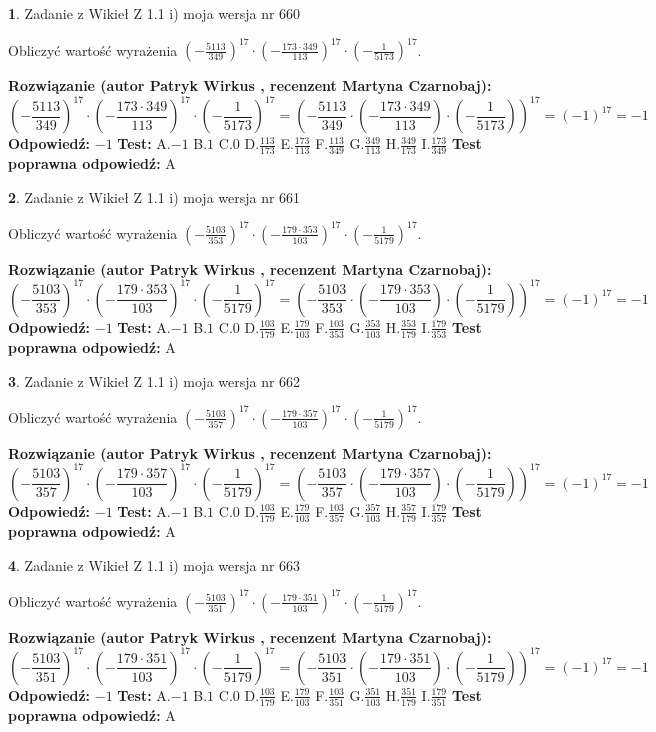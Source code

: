 \documentclass[12pt, a4paper]{article}
\theoremstyle{definition} %
\newtheorem{zad}{}
\newcommand{\zadStart}[1]{\begin{zad}#1\newline}
\newcommand{\zadStop}{\end{zad}}
\newcommand{\rozwStart}[2]{\noindent \textbf{Rozwiązanie (autor #1 , recenzent #2): }\newline}
\newcommand{\rozwStop}{\newline}
\newcommand{\odpStart}{\noindent \textbf{Odpowiedź:}\newline}
\newcommand{\odpStop}{\newline}
\newcommand{\testStart}{\noindent \textbf{Test:}\newline}
\newcommand{\testStop}{\newline}
\newcommand{\kluczStart}{\noindent \textbf{Test poprawna odpowiedź:}\newline}
\newcommand{\kluczStop}{\newline}
\begin{document}
\zadStart{Zadanie z Wikieł Z 1.1 i) moja wersja nr 660}

Obliczyć wartość wyrażenia $(-\frac{5113}{349})^{17} \cdot (-\frac{173 \cdot 349}{113})^{17} \cdot (-\frac{1}{5173})^{17}$.
\zadStop
\rozwStart{Patryk Wirkus}{Martyna Czarnobaj}
$$(-\frac{5113}{349})^{17} \cdot (-\frac{173 \cdot 349}{113})^{17} \cdot (-\frac{1}{5173})^{17} = (-\frac{5113}{349} \cdot (-\frac{173 \cdot 349}{113}) \cdot (-\frac{1}{5173}))^{17} = (-1)^{17} = -1$$
\rozwStop
\odpStart
$-1$
\odpStop
\testStart
A.$-1$ B.$1$ C.$0$ D.$\frac{113}{173}$ E.$\frac{173}{113}$
F.$\frac{113}{349}$ G.$\frac{349}{113}$
H.$\frac{349}{173}$
I.$\frac{173}{349}$
\testStop
\kluczStart
A
\kluczStop



\zadStart{Zadanie z Wikieł Z 1.1 i) moja wersja nr 661}

Obliczyć wartość wyrażenia $(-\frac{5103}{353})^{17} \cdot (-\frac{179 \cdot 353}{103})^{17} \cdot (-\frac{1}{5179})^{17}$.
\zadStop
\rozwStart{Patryk Wirkus}{Martyna Czarnobaj}
$$(-\frac{5103}{353})^{17} \cdot (-\frac{179 \cdot 353}{103})^{17} \cdot (-\frac{1}{5179})^{17} = (-\frac{5103}{353} \cdot (-\frac{179 \cdot 353}{103}) \cdot (-\frac{1}{5179}))^{17} = (-1)^{17} = -1$$
\rozwStop
\odpStart
$-1$
\odpStop
\testStart
A.$-1$ B.$1$ C.$0$ D.$\frac{103}{179}$ E.$\frac{179}{103}$
F.$\frac{103}{353}$ G.$\frac{353}{103}$
H.$\frac{353}{179}$
I.$\frac{179}{353}$
\testStop
\kluczStart
A
\kluczStop



\zadStart{Zadanie z Wikieł Z 1.1 i) moja wersja nr 662}

Obliczyć wartość wyrażenia $(-\frac{5103}{357})^{17} \cdot (-\frac{179 \cdot 357}{103})^{17} \cdot (-\frac{1}{5179})^{17}$.
\zadStop
\rozwStart{Patryk Wirkus}{Martyna Czarnobaj}
$$(-\frac{5103}{357})^{17} \cdot (-\frac{179 \cdot 357}{103})^{17} \cdot (-\frac{1}{5179})^{17} = (-\frac{5103}{357} \cdot (-\frac{179 \cdot 357}{103}) \cdot (-\frac{1}{5179}))^{17} = (-1)^{17} = -1$$
\rozwStop
\odpStart
$-1$
\odpStop
\testStart
A.$-1$ B.$1$ C.$0$ D.$\frac{103}{179}$ E.$\frac{179}{103}$
F.$\frac{103}{357}$ G.$\frac{357}{103}$
H.$\frac{357}{179}$
I.$\frac{179}{357}$
\testStop
\kluczStart
A
\kluczStop



\zadStart{Zadanie z Wikieł Z 1.1 i) moja wersja nr 663}

Obliczyć wartość wyrażenia $(-\frac{5103}{351})^{17} \cdot (-\frac{179 \cdot 351}{103})^{17} \cdot (-\frac{1}{5179})^{17}$.
\zadStop
\rozwStart{Patryk Wirkus}{Martyna Czarnobaj}
$$(-\frac{5103}{351})^{17} \cdot (-\frac{179 \cdot 351}{103})^{17} \cdot (-\frac{1}{5179})^{17} = (-\frac{5103}{351} \cdot (-\frac{179 \cdot 351}{103}) \cdot (-\frac{1}{5179}))^{17} = (-1)^{17} = -1$$
\rozwStop
\odpStart
$-1$
\odpStop
\testStart
A.$-1$ B.$1$ C.$0$ D.$\frac{103}{179}$ E.$\frac{179}{103}$
F.$\frac{103}{351}$ G.$\frac{351}{103}$
H.$\frac{351}{179}$
I.$\frac{179}{351}$
\testStop
\kluczStart
A
\kluczStop
\end{document}
